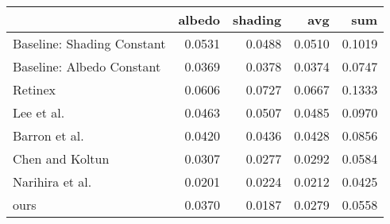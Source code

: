 \begin{tabular}{lrrrr}
\toprule
{} &  albedo &  shading &     avg &     sum \\
\midrule
Baseline: Shading Constant          &  0.0531 &   0.0488 &  0.0510 &  0.1019 \\
Baseline: Albedo Constant           &  0.0369 &   0.0378 &  0.0374 &  0.0747 \\
Retinex \cite{grosse2009}           &  0.0606 &   0.0727 &  0.0667 &  0.1333 \\
Lee et al. \cite{lee2012}           &  0.0463 &   0.0507 &  0.0485 &  0.0970 \\
Barron et al. \cite{barron2015}     &  0.0420 &   0.0436 &  0.0428 &  0.0856 \\
Chen and Koltun \cite{chen2013}     &  0.0307 &   0.0277 &  0.0292 &  0.0584 \\
Narihira et al. \cite{narihira2015} &  0.0201 &   0.0224 &  0.0212 &  0.0425 \\
ours                                &  0.0370 &   0.0187 &  0.0279 &  0.0558 \\
\bottomrule
\end{tabular}

